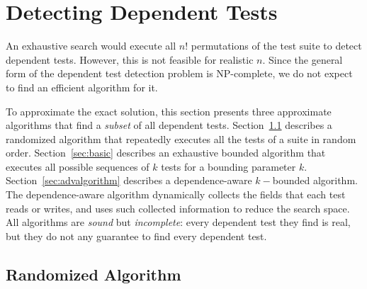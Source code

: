 \section{Detecting Dependent Tests}
\label{sec:detecting}

\newcommand{\testlist}[0]{\ensuremath{T^k_i}}
\newcommand{\executeTestsInOrder}[1]{\result{#1}{\env_0}}

An exhaustive search would execute all $n!$
permutations of the test suite to detect dependent tests.
However, this is not feasible for realistic $n$.
Since the general form of the dependent test detection problem is
NP-complete, we do not expect to find an efficient algorithm for it.

To approximate the exact solution, this section
presents three approximate algorithms that find a \textit{subset} of
all dependent tests.
Section~\ref{sec:randomized} describes a randomized algorithm
that repeatedly executes all the tests of a suite in random order.
Section~\ref{sec:basic} describes an exhaustive bounded algorithm that
executes all possible sequences of $k$ tests for a bounding parameter $k$.
Section~\ref{sec:advalgorithm} describes a dependence-aware $k-$bounded algorithm.
The dependence-aware algorithm dynamically collects the fields that each test
reads or writes, and uses such collected information to reduce the search space.
All algorithms are \textit{sound} but \textit{incomplete}:
every dependent test they find is real, but they do not
any guarantee to find every dependent test.

\subsection{Randomized Algorithm}
\label{sec:randomized}


